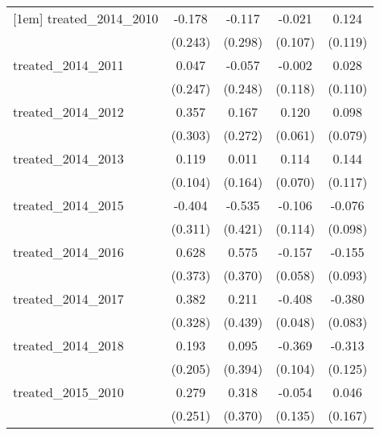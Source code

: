 {\begin{tabular}{l*{4}{c}}
[1em]
treated\_2014\_2010&      -0.178         &      -0.117         &      -0.021         &       0.124         \\
            &     (0.243)         &     (0.298)         &     (0.107)         &     (0.119)         \\
[1em]
treated\_2014\_2011&       0.047         &      -0.057         &      -0.002         &       0.028         \\
            &     (0.247)         &     (0.248)         &     (0.118)         &     (0.110)         \\
[1em]
treated\_2014\_2012&       0.357         &       0.167         &       0.120\sym{*}  &       0.098         \\
            &     (0.303)         &     (0.272)         &     (0.061)         &     (0.079)         \\
[1em]
treated\_2014\_2013&       0.119         &       0.011         &       0.114         &       0.144         \\
            &     (0.104)         &     (0.164)         &     (0.070)         &     (0.117)         \\
[1em]
treated\_2014\_2015&      -0.404         &      -0.535         &      -0.106         &      -0.076         \\
            &     (0.311)         &     (0.421)         &     (0.114)         &     (0.098)         \\
[1em]
treated\_2014\_2016&       0.628         &       0.575         &      -0.157\sym{**} &      -0.155         \\
            &     (0.373)         &     (0.370)         &     (0.058)         &     (0.093)         \\
[1em]
treated\_2014\_2017&       0.382         &       0.211         &      -0.408\sym{***}&      -0.380\sym{***}\\
            &     (0.328)         &     (0.439)         &     (0.048)         &     (0.083)         \\
[1em]
treated\_2014\_2018&       0.193         &       0.095         &      -0.369\sym{***}&      -0.313\sym{*}  \\
            &     (0.205)         &     (0.394)         &     (0.104)         &     (0.125)         \\
[1em]
treated\_2015\_2010&       0.279         &       0.318         &      -0.054         &       0.046         \\
            &     (0.251)         &     (0.370)         &     (0.135)         &     (0.167)         \\

\end{tabular}}

